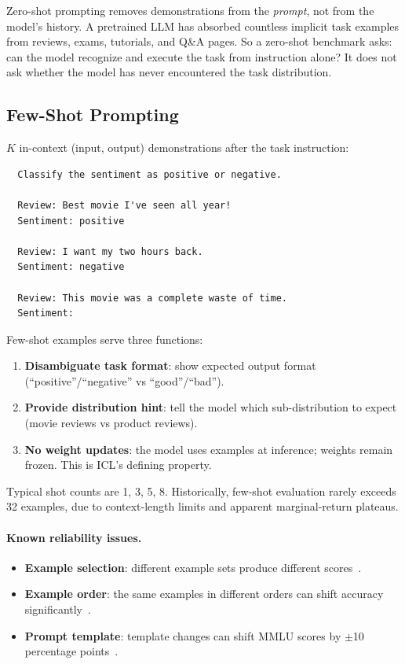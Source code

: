 \begin{tcolorbox}[colback=blue!3, colframe=blue!40, title={\small Zero-Shot Is Not Data-Free}]
Zero-shot prompting removes demonstrations from the \emph{prompt}, not from the
model's history. A pretrained LLM has absorbed countless implicit task examples
from reviews, exams, tutorials, and Q\&A pages. So a zero-shot benchmark asks:
can the model recognize and execute the task from instruction alone? It does
not ask whether the model has never encountered the task distribution.
\end{tcolorbox}

\subsection{Few-Shot Prompting}

$K$ in-context (input, output) demonstrations after the task instruction:

\begin{verbatim}
  Classify the sentiment as positive or negative.

  Review: Best movie I've seen all year!
  Sentiment: positive

  Review: I want my two hours back.
  Sentiment: negative

  Review: This movie was a complete waste of time.
  Sentiment:
\end{verbatim}

Few-shot examples serve three functions:
\begin{enumerate}[nosep]
  \item \textbf{Disambiguate task format}: show expected output format (``positive''/``negative'' vs ``good''/``bad'').
  \item \textbf{Provide distribution hint}: tell the model which sub-distribution to expect (movie reviews vs product reviews).
  \item \textbf{No weight updates}: the model uses examples at inference; weights remain frozen. This is ICL's defining property.
\end{enumerate}

Typical shot counts are 1, 3, 5, 8. Historically, few-shot evaluation rarely exceeds 32 examples, due to context-length limits and apparent marginal-return plateaus.

\paragraph{Known reliability issues.}
\begin{itemize}[nosep]
  \item \textbf{Example selection}: different example sets produce different scores~\cite{brown2020language}.
  \item \textbf{Example order}: the same examples in different orders can shift accuracy significantly~\cite{lu2022fantastically}.
  \item \textbf{Prompt template}: template changes can shift MMLU scores by $\pm$10 percentage points~\cite{sclar2023quantifying}.
\end{itemize}


